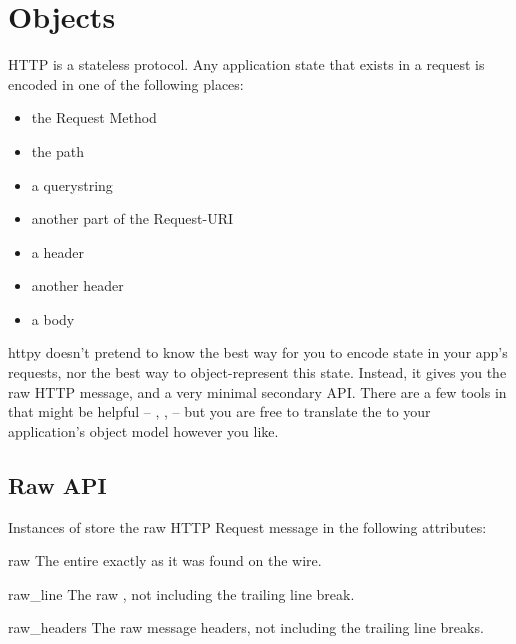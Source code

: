 \section{ Objects \label{request}}

HTTP is a stateless protocol. Any application state that exists in a request is
encoded in one of the following places:

\begin{itemize}
\item{the Request Method}
\item{the path}
\item{a querystring}
\item{another part of the Request-URI}
\item{a  header}
\item{another header}
\item{a  body}
\end{itemize}

httpy doesn't pretend to know the best way for you to encode state in your app's
requests, nor the best way to object-represent this state. Instead, it gives you
the raw HTTP message, and a very minimal secondary API. There are a few tools in
 that might be helpful -- ,
,  -- but you are free to translate
the  to your application's object model however you like.


\subsection{Raw API}

Instances of  store the raw HTTP Request message in the
following attributes:

\begin{datadesc}{raw}
The entire  exactly as it was found on the wire.
\end{datadesc}

\begin{datadesc}{raw_line}
The raw
,
 not including the trailing line break.
\end{datadesc}

\begin{datadesc}{raw_headers}
The raw message headers, not including the trailing line breaks.
\end{datadesc}


